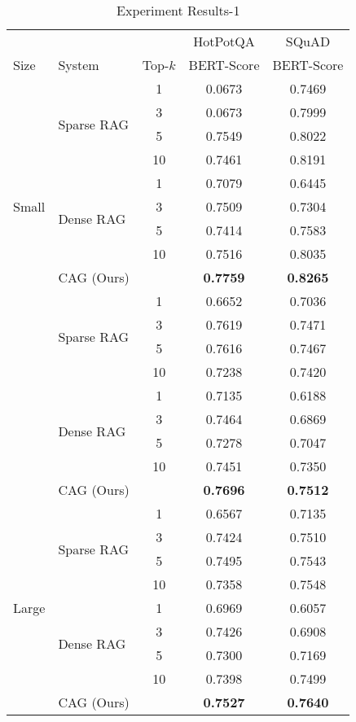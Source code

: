 \begin{table}
    \caption{Experiment Results-1}
    \label{tab:results}
    \begin{tabular}{llccc}
      \toprule
      & & & HotPotQA & SQuAD \\
      Size & System & Top-$k$ & BERT-Score & BERT-Score \\
      \midrule
      \multirow{11}{*}{Small}
        & \multirow{4}{*}{Sparse RAG}
          & 1 & 0.0673 & 0.7469\\
        & & 3 & 0.0673 & 0.7999 \\
        & & 5 & 0.7549 & 0.8022 \\
        & & 10 & 0.7461 & 0.8191 \\ \cline{2-5}
      & \multirow{4}{*}{Dense RAG}
          & 1   & 0.7079 & 0.6445\\
        & & 3   & 0.7509 & 0.7304 \\
        & & 5   & 0.7414 & 0.7583 \\
        & & 10  & 0.7516 & 0.8035 \\  \cline{2-5}
      & CAG (Ours) & & \textbf{0.7759} & \textbf{0.8265} \\
      \midrule
      \multirow{11}{*}{Medium}
        & \multirow{4}{*}{Sparse RAG}
          & 1   & 0.6652 & 0.7036\\
        & & 3   & 0.7619 & 0.7471 \\
        & & 5   & 0.7616 & 0.7467 \\
        & & 10  & 0.7238 & 0.7420 \\ \cline{2-5}
      & \multirow{4}{*}{Dense RAG}
          & 1   & 0.7135  & 0.6188\\
        & & 3   & 0.7464  & 0.6869 \\
        & & 5   & 0.7278  & 0.7047 \\
        & & 10  & 0.7451  & 0.7350 \\ \cline{2-5}
      & CAG (Ours) & & \textbf{0.7696} & \textbf{0.7512} 
   \\
      \midrule
      \multirow{11}{*}{Large}
        & \multirow{4}{*}{Sparse RAG}
          & 1   & 0.6567 & 0.7135 \\
        & & 3   & 0.7424 & 0.7510 \\
        & & 5   & 0.7495 & 0.7543 \\
        & & 10  & 0.7358 & 0.7548 \\ \cline{2-5} 
      & \multirow{4}{*}{Dense RAG}
          & 1   & 0.6969  & 0.6057 \\
        & & 3   & 0.7426  & 0.6908 \\
        & & 5   & 0.7300  & 0.7169 \\
        & & 10  & 0.7398  & 0.7499 \\ \cline{2-5}
      & CAG (Ours) & & \textbf{0.7527} & \textbf{0.7640} \\
      \bottomrule
    \end{tabular}
  \end{table}
  